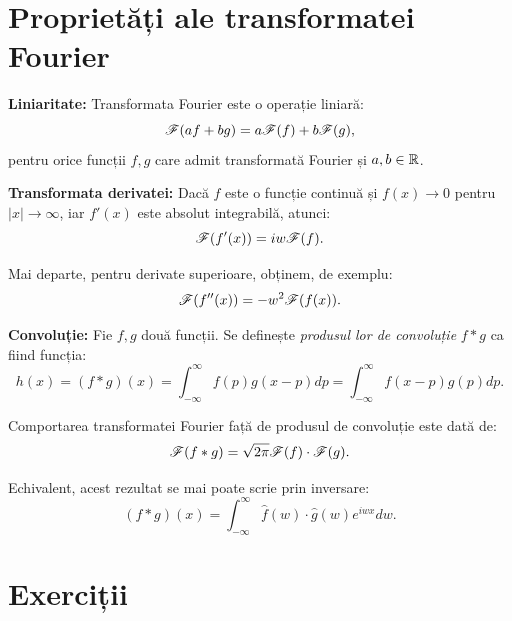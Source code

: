 \section{Proprietăți ale transformatei Fourier}


\indent\indent \textbf{Liniaritate:} Transformata Fourier este o operație liniară:
\[
  \mathscr{F}(af + bg) = a \mathscr{F}(f) + b \mathscr{F}(g),
\]
pentru orice funcții $ f, g $ care admit transformată Fourier și $ a, b \in \mathbb{R} $.

\vspace{1cm}

\textbf{Transformata derivatei:} Dacă $ f $ este o funcție continuă și $ f(x) \to 0 $
pentru $ |x| \to \infty $, iar $ f'(x) $ este absolut integrabilă, atunci:
\[
  \mathscr{F}(f'(x)) = iw \mathscr{F}(f).
\]

Mai departe, pentru derivate superioare, obținem, de exemplu:
\[
  \mathscr{F}(f^{\prime\prime}(x)) = -w^2 \mathscr{F}(f(x)).
\]

\vspace{1cm}

\textbf{Convoluție:} Fie $ f, g $ două funcții. Se definește \emph{produsul lor de %
  convoluție} $ f \ast g $ ca fiind funcția:
\[
  h(x) = (f \ast g)(x) = \int_{-\infty}^\infty f(p) g(x-p) dp = %
  \int_{-\infty}^\infty f(x - p) g(p) dp.
\]

Comportarea transformatei Fourier față de produsul de convoluție este dată de:
\[
  \mathscr{F}(f \ast g) = \sqrt{2\pi} \mathscr{F}(f) \cdot \mathscr{F}(g).
\]

Echivalent, acest rezultat se mai poate scrie prin inversare:
\[
  (f \ast g)(x) = \int_{-\infty}^\infty \widehat{f}(w) \cdot \widehat{g}(w) e^{iwx} dw.
\]


\section{Exerciții}

